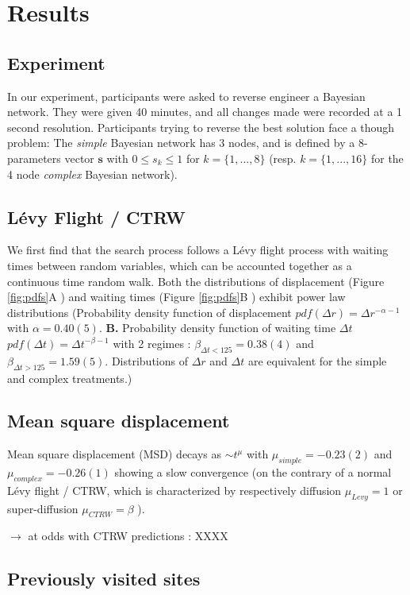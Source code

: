 \section{Results}

\subsection{Experiment}
In our experiment, participants were asked to reverse engineer a Bayesian network. They were given 40 minutes, and all changes made were recorded at a 1 second resolution. Participants trying to reverse the best solution face a though problem: The {\it simple} Bayesian network has 3 nodes, and is defined by a 8-parameters vector $\mathbf{s}$ with $0 \leqslant s_k  \leqslant 1$ for $k = \{1,...,8\}$ (resp. $k = \{1,..., 16\}$ for the 4 node {\it complex} Bayesian network). 


\subsection{L\'evy Flight / CTRW}
We first find that the search process follows a L\'evy flight process with waiting times between random variables, which can be accounted together as a continuous time random walk. Both the distributions of displacement (Figure \ref{fig:pdfs}A ) and waiting times (Figure \ref{fig:pdfs}B ) exhibit power law distributions  (Probability density function of displacement $pdf(\Delta r) = \Delta r^{-\alpha -1}$ with $\alpha = 0.40(5)$. {\bf B.} Probability density function of waiting time $\Delta t$ $pdf(\Delta t) = \Delta t^{-\beta -1}$ with 2 regimes : $\beta_{\Delta t < 125} = 0.38(4)$ and $\beta_{\Delta t > 125} = 1.59(5)$. Distributions of $\Delta r$ and $\Delta t$ are equivalent for the simple and complex treatments.)

\subsection{Mean square displacement}

Mean square displacement (MSD) decays as $\sim t^{\mu}$ with $\mu_{simple} =-0.23(2)$ and $\mu_{complex} =- 0.26(1)$ showing a slow convergence (on the contrary of a normal L\'evy flight / CTRW, which is characterized by respectively diffusion $\mu_{Levy} = 1$ or super-diffusion $\mu_{CTRW} = \beta$ \cite{21,23}). 

$\rightarrow$ at odds with CTRW predictions : XXXX


\subsection{Previously visited sites}

